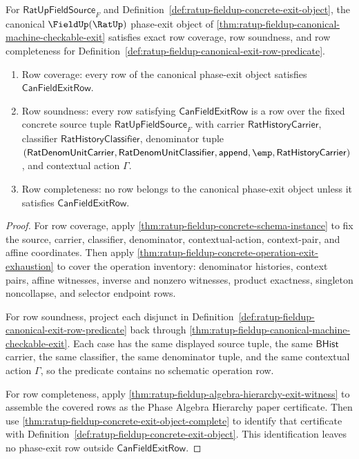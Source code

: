 \begin{theorem}
\label{thm:ratup-fieldup-canonical-exit-row-exactness}
For $\mathsf{RatUpFieldSource}_F$ and
Definition~\ref{def:ratup-fieldup-concrete-exit-object}, the canonical
$\FieldUp(\RatUp)$ phase-exit object of
\autoref{thm:ratup-fieldup-canonical-machine-checkable-exit} satisfies exact row
coverage, row soundness, and row completeness for
Definition~\ref{def:ratup-fieldup-canonical-exit-row-predicate}.
\begin{enumerate}
  \item Row coverage: every row of the canonical phase-exit object satisfies
  $\mathsf{CanFieldExitRow}$.
  \item Row soundness: every row satisfying $\mathsf{CanFieldExitRow}$ is a row
  over the fixed concrete source tuple $\mathsf{RatUpFieldSource}_F$ with carrier
  $\mathsf{RatHistoryCarrier}$, classifier $\mathsf{RatHistoryClassifier}$,
  denominator tuple
  $(\mathsf{RatDenomUnitCarrier},\mathsf{RatDenomUnitClassifier},
  \mathsf{append},\emp,\mathsf{RatHistoryCarrier})$, and contextual action
  $\Gamma$.
  \item Row completeness: no row belongs to the canonical phase-exit object
  unless it satisfies $\mathsf{CanFieldExitRow}$.
\end{enumerate}
\end{theorem}
\begin{proof}
For row coverage, apply
\autoref{thm:ratup-fieldup-concrete-schema-instance} to fix the source,
carrier, classifier, denominator, contextual-action, context-pair, and affine
coordinates. Then apply
\autoref{thm:ratup-fieldup-concrete-operation-exit-exhaustion} to cover the
operation inventory: denominator histories, context pairs, affine witnesses,
inverse and nonzero witnesses, product exactness, singleton noncollapse, and
selector endpoint rows.

For row soundness, project each disjunct in
Definition~\ref{def:ratup-fieldup-canonical-exit-row-predicate} back through
\autoref{thm:ratup-fieldup-canonical-machine-checkable-exit}. Each case has the
same displayed source tuple, the same $\mathsf{BHist}$ carrier, the same
classifier, the same denominator tuple, and the same contextual action
$\Gamma$, so the predicate contains no schematic operation row.

For row completeness, apply
\autoref{thm:ratup-fieldup-algebra-hierarchy-exit-witness} to assemble the
covered rows as the Phase Algebra Hierarchy paper certificate. Then use
\autoref{thm:ratup-fieldup-concrete-exit-object-complete} to identify that
certificate with Definition~\ref{def:ratup-fieldup-concrete-exit-object}. This
identification leaves no phase-exit row outside
$\mathsf{CanFieldExitRow}$.
\end{proof}

